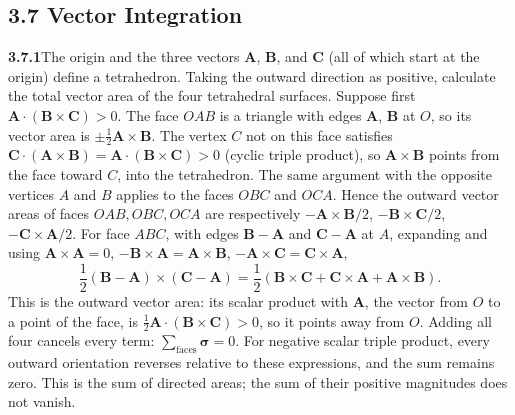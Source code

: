 \subsection*{3.7 Vector Integration}

\par\bigskip
\noindent\textbf{3.7.1}\quad The origin and the three vectors $\mathbf{A}$,
$\mathbf{B}$, and $\mathbf{C}$ (all of which start at the origin) define a
tetrahedron. Taking the outward direction as positive, calculate the total
vector area of the four tetrahedral surfaces.
\solution
Suppose first $\mathbf A\cdot(\mathbf B\times\mathbf C)>0$.
The face $OAB$ is a triangle with edges $\mathbf A$, $\mathbf B$ at
$O$, so its vector area is $\pm\frac12\mathbf A\times\mathbf B$. The
vertex $C$ not on this face satisfies
$\mathbf C\cdot(\mathbf A\times\mathbf B)
=\mathbf A\cdot(\mathbf B\times\mathbf C)>0$ (cyclic triple product), so
$\mathbf A\times\mathbf B$ points from the face toward $C$, into the
tetrahedron. The same argument with the opposite vertices $A$ and $B$
applies to the faces $OBC$ and $OCA$. Hence the outward vector areas of
faces $OAB,OBC,OCA$ are respectively
$-\mathbf A\times\mathbf B/2$,
$-\mathbf B\times\mathbf C/2$,
$-\mathbf C\times\mathbf A/2$.
For face $ABC$, with edges $\mathbf B-\mathbf A$ and $\mathbf C-\mathbf A$
at $A$, expanding and using $\mathbf A\times\mathbf A=0$,
$-\mathbf B\times\mathbf A=\mathbf A\times\mathbf B$,
$-\mathbf A\times\mathbf C=\mathbf C\times\mathbf A$,
\[
\frac12(\mathbf B-\mathbf A)\times(\mathbf C-\mathbf A)
=\frac12(\mathbf B\times\mathbf C+\mathbf C\times\mathbf A+
\mathbf A\times\mathbf B).
\]
This is the outward vector area: its scalar product with $\mathbf A$,
the vector from $O$ to a point of the face, is
$\frac12\mathbf A\cdot(\mathbf B\times\mathbf C)>0$, so it points away
from $O$.
Adding all four cancels every term:
$\boxed{\sum_{\text{faces}}\boldsymbol{\sigma}=0}$.
For negative scalar triple product, every outward orientation reverses
relative to these expressions, and the sum remains zero.
This is the sum of directed areas; the sum of their positive magnitudes
does not vanish.


